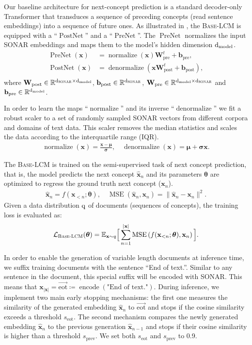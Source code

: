 \documentclass[twoside,11pt]{fairmeta}
\newcommand{\sonar}{\textsc{SONAR}\xspace}
\newcommand{\mselcm}{\textsc{Base-LCM}\xspace}
\DeclareMathOperator{\normalize}{normalize}
\DeclareMathOperator{\denormalize}{denormalize}
\DeclareMathOperator{\encode}{encode}
\DeclareMathOperator{\postnet}{PostNet}
\DeclareMathOperator{\prenet}{PreNet}
\DeclareMathOperator{\mse}{MSE}
\newcommand{\modeldim}{\rd_\text{model}}
\newcommand{\sonardim}{\rd_\text{\sonar}}
\newcommand{\defeq}{\coloneqq}
\def\rd{{\textnormal{d}}}
\def\rq{{\textnormal{q}}}
\def\rvsigma{{\bm{\sigma}}}
\def\rvtheta{{\bm{\theta}}}
\def\rvmu{{\bm{\mu}}}
\def\rvb{{\mathbf{b}}}
\def\rvx{{\mathbf{x}}}
\def\rmW{{\mathbf{W}}}
\begin{document}
Our baseline architecture for next-concept prediction is a standard decoder-only Transformer that transduces a sequence of preceding concepts (read sentence embeddings) into a sequence of future ones. 
As illustrated in , the \mselcm is equipped with a ``$\postnet$'' and a ``$\prenet$''. The $\prenet$ normalizes the input \sonar embeddings and maps them to the model's hidden dimension $\modeldim$.
\begin{align}
\prenet(\rvx) &= \normalize(\rvx) \rmW_\text{pre}^t + \rvb_\text{pre}, \\
\postnet(\rvx) &= \denormalize\left(\rvx \rmW_\text{post}^t + \rvb_\text{post}\right), \\
\end{align}
where $\rmW_\text{post}\in\mathbb R^{\sonardim \times \modeldim}$, 
$\rvb_\text{post} \in \mathbb R^{\sonardim}$,
$\rmW_\text{pre}\in\mathbb R^{\modeldim \times \sonardim}$ and
$\rvb_\text{pre} \in \mathbb R^{\modeldim}$.

In order to learn the maps ``$\normalize$'' and its inverse ``$\denormalize$'' we fit a robust scaler to a set of randomly sampled \sonar vectors from different corpora and domains of text data. This scaler removes the median statistics and scales the data according to the interquartile range (IQR).
\begin{align}
\normalize(\rvx) = \frac{\rvx - \rvmu}{\rvsigma}, \quad
\denormalize(\rvx) = \rvmu + \rvsigma \rvx.
\label{eq:sonar:normalizer}
\end{align}

The \mselcm is trained on the semi-supervised task of next concept prediction, that is, the model predicts the next concept $\hat\rvx_n$ and its parameters $\rvtheta$ are optimized to regress the ground truth next concept ($\rvx_n$).
\begin{align}
  \hat\rvx_n =  f(\rvx_{<n}; \rvtheta),\quad \mse(\hat\rvx_n, \rvx_n) = \|\hat \rvx_n - \rvx_n\|^2.
\end{align}
Given a data distribution $\rq$ of documents (sequences of concepts), the training loss is evaluated as:
\begin{align}
\mathcal L_\mselcm(\rvtheta) = \mathbb E_{\rvx\sim q}\Big[\sum_{n=1}^{|\rvx|} \mse\left(f(\rvx_{<n}; \rvtheta), \rvx_n\right)\Big].
\end{align}

In order to enable the generation of variable length documents at inference time, we suffix training documents with the sentence ``End of text.''. Similar to any sentence in the document, this special suffix will be encoded with \sonar. This means that $\rvx_{|\rvx|} = \overrightarrow{\text{eot}} \defeq \encode(\text{"End of text."})$. During inference, we implement two main early stopping mechanisms: the first one measures the similarity of the generated embedding $\hat\rvx_n$ to $\overrightarrow{\text{eot}}$ and stops if the cosine similarity exceeds a threshold $s_\text{eot}$. The second mechanism compares the newly generated embedding $\hat\rvx_n$ to the previous generation $\hat\rvx_{n-1}$ and stops if their cosine similarity is higher than a threshold $s_\text{prev}$. We set both $s_\text{eot}$ and $s_\text{prev}$ to 0.9.
\end{document}
